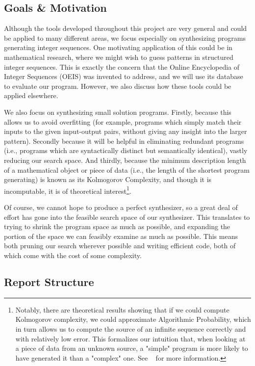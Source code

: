 \subsection{Goals \& Motivation}

Although the tools developed throughout this project are very general and could be applied to many different areas, we focus especially on synthesizing programs generating integer sequences. One motivating application of this could be in mathematical research, where we might wish to guess patterns in structured integer sequences. This is exactly the concern that the Online Encyclopedia of Integer Sequences (OEIS) was invented to address, and we will use its database to evaluate our program. However, we also discuss how these tools could be applied elsewhere.

We also focus on synthesizing small solution programs. Firstly, because this allows us to avoid overfitting (for example, programs which simply match their inputs to the given input-output pairs, without giving any insight into the larger pattern). Secondly because it will be helpful in eliminating redundant programs (i.e., programs which are syntactically distinct but semantically identical), vastly reducing our search space. And thirdly, because the minimum description length of a mathematical object or piece of data (i.e., the length of the shortest program generating) is known as its Kolmogorov Complexity, and though it is incomputable, it is of theoretical interest\footnote{Notably, there are theoretical results showing that if we could compute Kolmogorov complexity, we could approximate Algorithmic Probability, which in turn allows us to compute the source of an infinite sequence correctly and with relatively low error. This formalizes our intuition that, when looking at a piece of data from an unknown source, a "simple" program is more likely to have generated it than a "complex" one. See ~\cite{Solomonoff} for more information.}.

Of course, we cannot hope to produce a perfect synthesizer, so a great deal of effort has gone into the feasible search space of our synthesizer. This translates to trying to shrink the program space as much as possible, and expanding the portion of the space we can feasibly examine as much as possible. This means both pruning our search wherever possible and writing efficient code, both of which come with the cost of some complexity.

\subsection{Report Structure}

